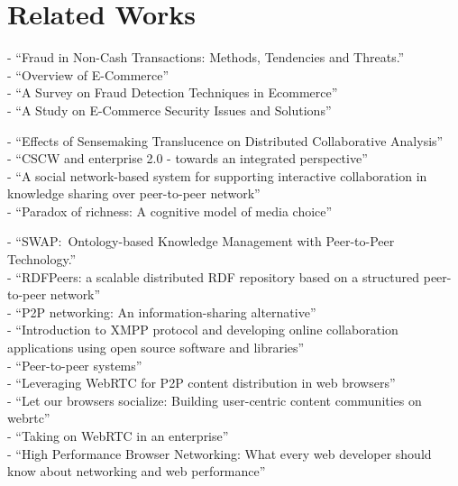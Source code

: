 
\chapter{Related Works}
\label{cha:related_works}

- ``Fraud in Non-Cash Transactions: Methods, Tendencies and Threats.'' \citep{sobko2014fraud} \\
- ``Overview of E-Commerce'' \citep{ankhule2015overview} \\
- ``A Survey on Fraud Detection Techniques in Ecommerce'' \citep{rana2015survey} \\
- ``A Study on E-Commerce Security Issues and Solutions'' \citep{sen2015study}

- ``Effects of Sensemaking Translucence on Distributed Collaborative Analysis'' \citep{goyaleffects} \\
- ``CSCW and enterprise 2.0 - towards an integrated perspective'' \citep{Koch2008} \\
- ``A social network-based system for supporting interactive collaboration in knowledge sharing over peer-to-peer network'' \citep{yang2008social} \\
- ``Paradox of richness: A cognitive model of media choice'' \citep{robert2005paradox}

- ``SWAP:\ Ontology-based Knowledge Management with Peer-to-Peer Technology.'' \citep{ehrig2003swap} \\
- ``RDFPeers: a scalable distributed RDF repository based on a structured peer-to-peer network'' \citep{cai2004rdfpeers} \\
- ``P2P networking: An information-sharing alternative'' \citep{parameswaran2001p2p} \\
- ``Introduction to XMPP protocol and developing online collaboration applications using open source software and libraries'' \citep{ozturk2010introduction} \\
- ``Peer-to-peer systems'' \citep{rodrigues2010peer} \\
- ``Leveraging WebRTC for P2P content distribution in web browsers'' \citep{vogt2013leveraging} \\
- ``Let our browsers socialize: Building user-centric content communities on webrtc'' \citep{werner2014let} \\
- ``Taking on WebRTC in an enterprise'' \citep{vogt2013leveraging} \\
- ``High Performance Browser Networking: What every web developer should know about networking and web performance'' \citep{grigorik2013high}

